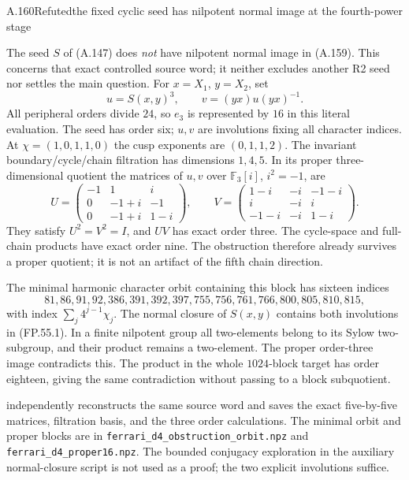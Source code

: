 \begin{statement}{A.160}{Refuted}{the fixed cyclic seed has nilpotent normal image at the fourth-power stage}
\end{statement}
The seed $S$ of (A.147) does \emph{not} have nilpotent normal image
in (A.159). This concerns that exact controlled source word;
it neither excludes another R2 seed nor settles the main question.
For $x=X_1$, $y=X_2$, set
\[
              u=S(x,y)^3,\qquad v=(yx)u(yx)^{-1}.
 \tag{FP.55.1}
\]
All peripheral orders divide $24$, so $e_3$ is represented by
$16$ in this literal evaluation. The seed has order six; $u,v$
are involutions fixing all character indices. At
$\chi=(1,0,1,1,0)$ the cusp exponents are $(0,1,1,2)$.
The invariant boundary/cycle/chain filtration has dimensions
$1,4,5$. In its proper three-dimensional quotient the matrices
of $u,v$ over $\mathbb F_3[i]$, $i^2=-1$, are
\[
 U=\begin{pmatrix}-1&1&i\\0&-1+i&-1\\0&-1+i&1-i\end{pmatrix},\qquad
 V=\begin{pmatrix}1-i&-i&-1-i\\i&-i&i\\-1-i&-i&1-i\end{pmatrix}.
 \tag{FP.55.2}
\]
They satisfy $U^2=V^2=I$, and $UV$ has exact order three.
The cycle-space and full-chain products have exact order nine.
The obstruction therefore already survives a proper quotient;
it is not an artifact of the fifth chain direction.

The minimal harmonic character orbit containing this block has
sixteen indices
\[
81,86,91,92,386,391,392,397,755,756,761,766,800,805,810,815,
\]
with index $\sum_j4^{j-1}\chi_j$.
The normal closure of $S(x,y)$ contains both involutions in
(FP.55.1). In a finite nilpotent group all two-elements belong
to its Sylow two-subgroup, and their product remains a two-element.
The proper order-three image contradicts this. The product in
the whole $1024$-block target has order eighteen, giving the same
contradiction without passing to a block subquotient.

 independently reconstructs
the same source word and saves the exact five-by-five matrices,
filtration basis, and the three order calculations.
The minimal orbit and proper blocks are in
\texttt{ferrari\_d4\_obstruction\_orbit.npz} and
\texttt{ferrari\_d4\_proper16.npz}.
The bounded conjugacy exploration in the auxiliary normal-closure
script is not used as a proof; the two explicit involutions suffice.

